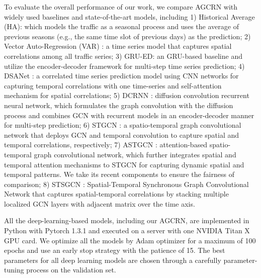 \documentclass{article}
\begin{document}
To evaluate the overall performance of our work, we compare AGCRN with widely used baselines and state-of-the-art models, including 1) Historical Average (HA): which models the traffic as a seasonal process and uses the average of previous seasons (e.g., the same time slot of previous days) as the prediction; 2) Vector Auto-Regression (VAR) \cite{var}: a time series model that captures spatial correlations among all traffic series; 3) GRU-ED: an GRU-based baseline and utilize the encoder-decoder framework \cite{encoder-decoder} for multi-step time series prediction; 
4) DSANet \cite{dsanet}: a correlated time series prediction model using CNN networks for capturing temporal correlations with one time-series and self-attention mechanism for spatial correlations;
5) DCRNN \cite{DCRNN}: diffusion convolution recurrent neural network, which formulates the graph convolution with the diffusion process and combines GCN with recurrent models in an
encoder-decoder manner for multi-step prediction; 
6) STGCN \cite{stgcn}: a spatio-temporal graph convolutional network that deploys GCN and temporal convolution to capture spatial and temporal correlations, respectively; 
7) ASTGCN \cite{astgcn}: attention-based spatio-temporal graph convolutional network, which further integrates spatial and temporal attention mechanisms to STGCN for capturing dynamic spatial and temporal patterns. We take its recent components to ensure the fairness of comparison;
8) STSGCN \cite{stsgcn-aaai2020}: Spatial-Temporal Synchronous Graph Convolutional Network that captures spatial-temporal correlations by stacking multiple localized GCN layers with adjacent matrix over the time axis. 

All the deep-learning-based models, including our AGCRN, are implemented in Python with Pytorch 1.3.1 and executed on a server with one NVIDIA Titan X GPU card. We optimize all the models by Adam optimizer for a maximum of 100 epochs and use an early stop strategy with the patience of 15. The best parameters for all deep learning models are chosen through a carefully parameter-tuning process on the validation set.
\end{document}
